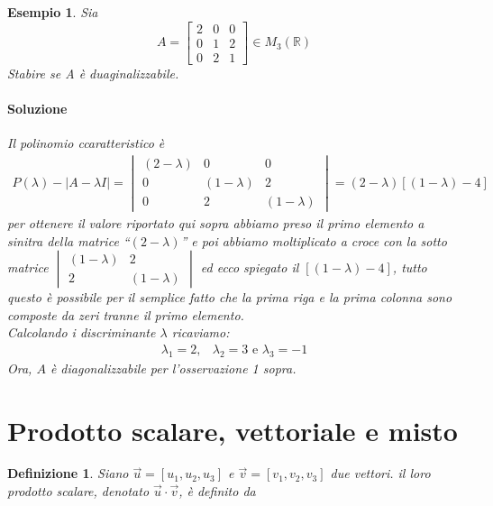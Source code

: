 \documentclass{book}
\newtheorem{defi}{Definizione}[section]
\newtheorem{esempio}{Esempio}[section]
\newcommand{\abs}[1]{\lvert#1\rvert}
\begin{document}
\begin{esempio}
  Sia
  \begin{equation}
    \label{eq:critDiag7}
    A=
    \begin{bmatrix}
      2 & 0 & 0 \\
      0 & 1 & 2 \\
      0 & 2 & 1
    \end{bmatrix} \in M_3(\mathds{R})
  \end{equation}
  Stabire se A è duaginalizzabile.
  
\paragraph{Soluzione}

Il polinomio ccaratteristico è
\begin{eqnarray*}
  P(\lambda)-\abs{A-\lambda I}=
  \begin{vmatrix}
    (2-\lambda) & 0 & 0\\
    0 & (1-\lambda) & 2\\
    0 & 2 & (1-\lambda)
  \end{vmatrix} = (2-\lambda)[(1-\lambda)-4]
\end{eqnarray*}
per ottenere il valore riportato qui sopra abbiamo preso il primo elemento
a sinitra della matrice ``$(2-\lambda)$'' e poi abbiamo moltiplicato a croce
con la sotto matrice $
\begin{vmatrix}
   (1-\lambda) & 2\\
   2 & (1-\lambda)
\end{vmatrix}
$ ed ecco spiegato il $[(1-\lambda)-4]$, tutto questo è possibile per il semplice fatto che la prima riga e la prima colonna sono composte da zeri tranne il primo elemento.\\
Calcolando i discriminante $\lambda$ ricaviamo:
\begin{eqnarray*}
  \lambda_1=2, & \lambda_2=3 \text{ e } \lambda_3=-1
\end{eqnarray*}
Ora, $A$ è diagonalizzabile per l'osservazione 1 sopra.
\end{esempio}

\section{Prodotto scalare, vettoriale e misto}
\label{sec:prodscalmisto}

\begin{defi}
  Siano $\vec{u}=[u_1,u_2,u_3]$ e $\vec{v}=[v_1,v_2,v_3]$ due vettori. il loro
  prodotto scalare, denotato $\vec{u}\cdot \vec{v}$, è definito da
  
\end{defi}
\end{document}
